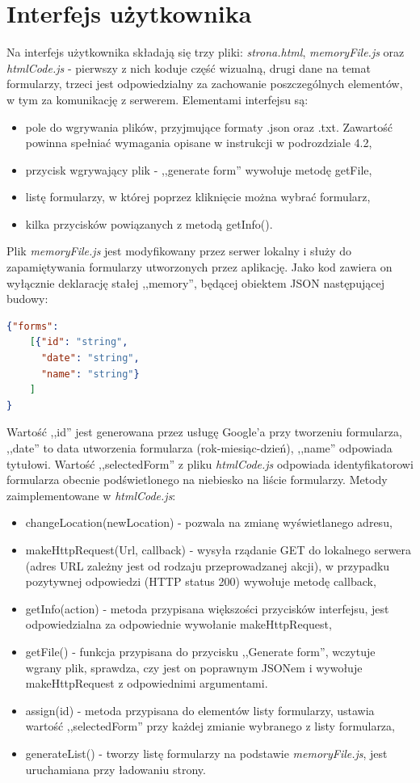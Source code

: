 \section{Interfejs użytkownika}
Na interfejs użytkownika składają się trzy pliki: \textit{strona.html}, \textit{memoryFile.js} oraz \textit{htmlCode.js} - pierwszy z nich koduje część wizualną, drugi dane na temat formularzy, trzeci jest odpowiedzialny za zachowanie poszczególnych elementów, w tym za komunikację z serwerem. 
\ind Elementami interfejsu są:
\begin{itemize}
\item pole do wgrywania plików, przyjmujące formaty .json oraz .txt. Zawartość powinna spełniać wymagania opisane w instrukcji w podrozdziale 4.2, %
\item przycisk wgrywający plik - ,,generate form'' wywołuje metodę getFile,
\item listę formularzy, w której poprzez kliknięcie można wybrać formularz,
\item kilka przycisków powiązanych z metodą getInfo().
\end{itemize}
\ind Plik \textit{memoryFile.js} jest modyfikowany przez serwer lokalny i służy do zapamiętywania formularzy utworzonych przez aplikację. Jako kod zawiera on wyłącznie deklarację stałej ,,memory'', będącej obiektem JSON następującej budowy:
\begin{lstlisting}[language=json,firstnumber=1]
{"forms":
    [{"id": "string",
      "date": "string",
      "name": "string"}
    ]
}
\end{lstlisting}
Wartość ,,id'' jest generowana przez usługę Google'a przy tworzeniu formularza, ,,date'' to data utworzenia formularza (rok-miesiąc-dzień), ,,name'' odpowiada tytułowi.
\ind Wartość ,,selectedForm'' z pliku \textit{htmlCode.js} odpowiada identyfikatorowi formularza obecnie podświetlonego na niebiesko na liście formularzy. Metody zaimplementowane w \textit{htmlCode.js}:
\begin{itemize}
\item changeLocation(newLocation) - pozwala na zmianę wyświetlanego adresu,
\item makeHttpRequest(Url, callback) - wysyła rządanie GET do lokalnego serwera (adres URL zależny jest od rodzaju przeprowadzanej akcji), w przypadku pozytywnej odpowiedzi (HTTP status 200) wywołuje metodę callback,
\item getInfo(action) - metoda przypisana większości przycisków interfejsu, jest odpowiedzialna za odpowiednie wywołanie makeHttpRequest,
\item getFile() - funkcja przypisana do przycisku ,,Generate form'', wczytuje wgrany plik, sprawdza, czy jest on poprawnym JSONem i wywołuje makeHttpRequest z odpowiednimi argumentami.
\item assign(id) - metoda przypisana do elementów listy formularzy, ustawia wartość ,,selectedForm'' przy każdej zmianie wybranego z listy formularza,
\item generateList() - tworzy listę formularzy na podstawie \textit{memoryFile.js}, jest uruchamiana przy ładowaniu strony.
\end{itemize}


